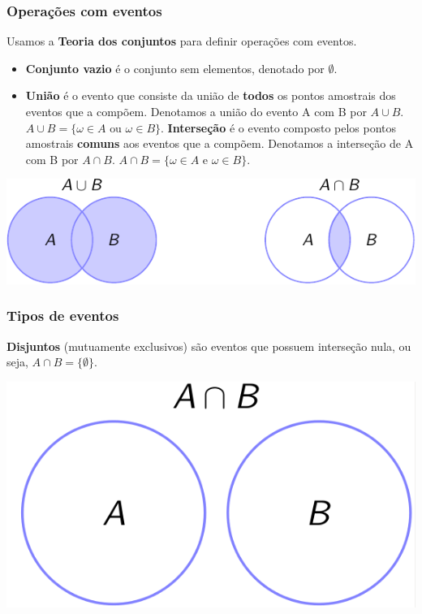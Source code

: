 \documentclass[11pt]{beamer}
\begin{document}
\begin{frame}
\frametitle{Operações com eventos}

Usamos a \textbf{Teoria dos conjuntos} para definir operações com
eventos.

\begin{itemize}
  \item
  \textbf{Conjunto vazio} é o conjunto sem elementos, denotado por
  \(\emptyset\).
  \item
  \textbf{União} é o evento que consiste da união de \textbf{todos} os
  pontos amostrais dos eventos que a compõem. Denotamos a união do
  evento A com B por \(A\cup B\).
  \(A \cup B = \{\omega \in A \text{ ou } \omega \in B\}\).
  \textbf{Interseção} é o evento composto pelos pontos amostrais
  \textbf{comuns} aos eventos que a compõem. Denotamos a interseção de A
  com B por \(A \cap B\).
  \(A \cap B = \{\omega \in A \text{ e } \omega \in B\}\).
\end{itemize}

\begin{center}\includegraphics[width=0.9\linewidth]{figs/regra_adicao1-crop} \end{center}

\end{frame}

\begin{frame}
\frametitle{Tipos de eventos}
  \textbf{Disjuntos} (mutuamente exclusivos) são eventos que possuem
  interseção nula, ou seja, \(A\cap B = \{\emptyset\}\). \scriptsize

\begin{center}\includegraphics[width=0.25\linewidth]{figs/Disjuntos} \end{center}

\end{frame}
\end{document}
